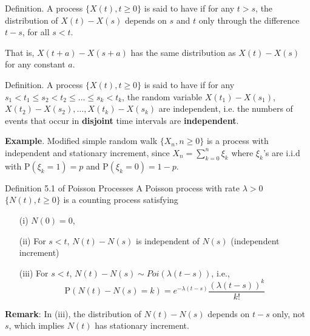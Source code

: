 \documentclass[letterpaper,handout, mathserif]{beamer}
\def\p{\mathrm P}
\begin{document}
\begin{frame}
\begin{block}{Definition.}
A process $\{X(t), t\ge 0\}$ is said to have  if for any $t>s$, the distribution of $X(t)-X(s)$ depends on $s$ and $t$ only through the
difference $t-s$, for all $s < t$.\par
That is, $X(t+a)-X(s+a)$ has the same distribution as $X(t)-X(s)$ for any constant $a$.
\end{block}\medskip
\begin{block}{Definition.}
A process $\{X(t), t\ge 0\}$ is said to have  if  for any $s_1< t_1\le s_2< t_2\le\ldots\le s_k<t_k$, the random variable $X(t_1)-X(s_1)$, $X(t_2)-X(s_2),\ldots,X(t_k)-X(s_k)$ are independent, i.e. the numbers of events that occur in {\bf disjoint} time intervals are {\bf independent}.
\end{block}\bigskip

{\bf Example}. Modified simple random walk $\{X_n, n\ge 0\}$ is a process with independent and stationary increment, since
$X_n=\sum_{k=0}^n \xi_k$ where $\xi_k$'s are i.i.d with $\p(\xi_k=1)=p$ and $\p(\xi_k=0)=1-p$.
\end{frame}
\begin{frame}{Definition 5.1 of Poisson Processes}
A Poisson process with rate $\lambda>0$ $\{N(t), t\ge 0\}$ is a counting process satisfying
\begin{itemize}
\item [(i)] $N(0)=0$,
\item [(ii)] For $s<t$, $N(t)-N(s)$ is independent of $N(s)$ (independent increment)
\item [(iii)] For $s < t$, $N(t) - N(s)\sim Poi(\lambda(t-s))$, i.e.,
$$\p(N(t) - N(s)=k)=e^{-\lambda(t-s)}\frac{(\lambda(t-s))^k}{k!}$$
\end{itemize}
\bigskip

{\bf Remark}: In (iii), the distribution of $N(t) - N(s)$ depends on $t-s$ only, not $s$, which
implies $N(t)$ has stationary increment.
\end{frame}
\end{document}
